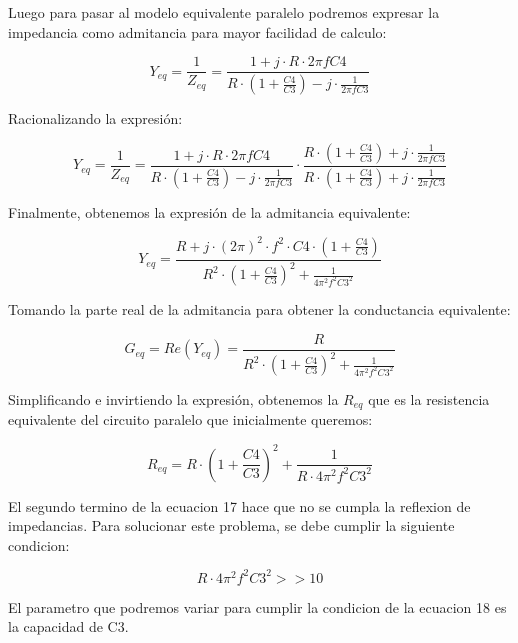 Luego para pasar al modelo equivalente paralelo podremos expresar la impedancia como admitancia para mayor facilidad de calculo:

\begin{equation}
    Y_{eq} = \frac{1}{Z_{eq}} = \frac{1 + j \cdot R \cdot 2 \pi f C4}{R \cdot (1 + \frac{C4}{C3}) - j \cdot \frac{1}{2 \pi f C3}}
\end{equation}

Racionalizando la expresión:

\begin{equation}
    Y_{eq} =  \frac{1}{Z_{eq}} = \frac{1 + j \cdot R \cdot 2 \pi f C4}{R \cdot (1 + \frac{C4}{C3}) - j \cdot \frac{1}{2 \pi f C3}} \cdot \frac{R \cdot (1 + \frac{C4}{C3}) + j \cdot \frac{1}{2 \pi f C3}}{R \cdot (1 + \frac{C4}{C3}) + j \cdot \frac{1}{2 \pi f C3}}
\end{equation}

Finalmente, obtenemos la expresión de la admitancia equivalente:

\begin{equation}
    Y_{eq} = \frac{R + j \cdot (2 \pi)^2 \cdot f^2 \cdot C4 \cdot (1 + \frac{C4}{C3})}{R^2 \cdot (1 + \frac{C4}{C3})^2 + \frac{1}{4 \pi^2 f^2 C3^2}}
\end{equation}

Tomando la parte real de la admitancia para obtener la conductancia equivalente:

\begin{equation}
    G_{eq}= Re(Y_{eq}) = \frac{R}{R^2 \cdot (1 + \frac{C4}{C3})^2 + \frac{1}{4 \pi^2 f^2 C3^2}}
\end{equation}

Simplificando e invirtiendo la expresión, obtenemos la $R_{eq}$ que es la resistencia equivalente del circuito paralelo que inicialmente queremos:

\begin{equation}
    R_{eq} = R \cdot (1 + \frac{C4}{C3})^2 + \frac{1}{R \cdot 4 \pi^2 f^2 C3^2}
\end{equation}

El segundo termino de la ecuacion 17 hace que no se cumpla la reflexion de impedancias. Para solucionar este problema, se debe cumplir la siguiente condicion:

\begin{equation}
    R \cdot 4 \pi^2 f^2 C3^2 >> 10 
\end{equation}

El parametro que podremos variar para cumplir la condicion de la ecuacion 18 es la capacidad de C3. 




